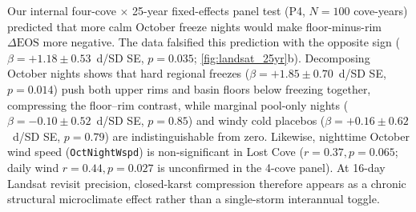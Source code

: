 Our internal four-cove $\times$ 25-year fixed-effects panel test (P4, $N=100$ cove-years) predicted that more calm October freeze nights would make floor-minus-rim $\Delta\text{EOS}$ more negative. The data falsified this prediction with the opposite sign ($\beta=+1.18 \pm 0.53$~d/SD SE, $p=0.035$; \cref{fig:landsat_25yr}b). Decomposing October nights shows that hard regional freezes ($\beta=+1.85 \pm 0.70$~d/SD SE, $p=0.014$) push both upper rims and basin floors below freezing together, compressing the floor--rim contrast, while marginal pool-only nights ($\beta=-0.10 \pm 0.52$~d/SD SE, $p=0.85$) and windy cold placebos ($\beta=+0.16 \pm 0.62$~d/SD SE, $p=0.79$) are indistinguishable from zero. Likewise, nighttime October wind speed (\texttt{OctNightWspd}) is non-significant in Lost Cove ($r=0.37, p=0.065$; daily wind $r=0.44, p=0.027$ is unconfirmed in the 4-cove panel). At 16-day Landsat revisit precision, closed-karst compression therefore appears as a chronic structural microclimate effect rather than a single-storm interannual toggle.

